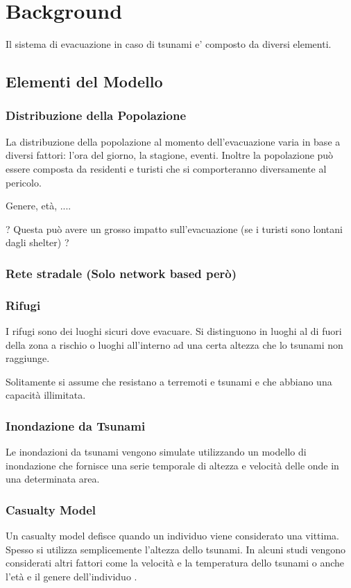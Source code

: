 \section{Background}
Il sistema di evacuazione in caso di tsunami e' composto da diversi elementi.

\subsection{Elementi del Modello}

\subsubsection{Distribuzione della Popolazione}
La distribuzione della popolazione al momento dell'evacuazione varia in base a diversi fattori: 
l'ora del giorno, la stagione, eventi. Inoltre la popolazione può essere composta da residenti e 
turisti che si comporteranno diversamente al pericolo. 

Genere, età, ....

? Questa può avere un grosso impatto sull'evacuazione (se i  turisti sono lontani dagli shelter) ?

\subsubsection{Rete stradale (Solo network based però)}

\subsubsection{Rifugi}
I rifugi sono dei luoghi sicuri dove evacuare.
Si distinguono in luoghi al di fuori della zona a rischio o 
luoghi all'interno ad una certa altezza che lo tsunami non raggiunge.

Solitamente si assume che resistano a terremoti e tsunami e che abbiano una capacità illimitata.

\subsubsection{Inondazione da Tsunami}
Le inondazioni da tsunami vengono simulate utilizzando un modello di inondazione 
che fornisce una serie temporale di altezza e velocità delle onde in una determinata area.

\subsubsection{Casualty Model}
Un casualty model defisce quando un individuo viene considerato una vittima. 
Spesso si utilizza semplicemente l'altezza dello tsunami.
In alcuni studi vengono considerati altri fattori come la velocità 
e la temperatura dello tsunami o anche l'età e il genere dell'individuo \cite{yeh2010gender}.

